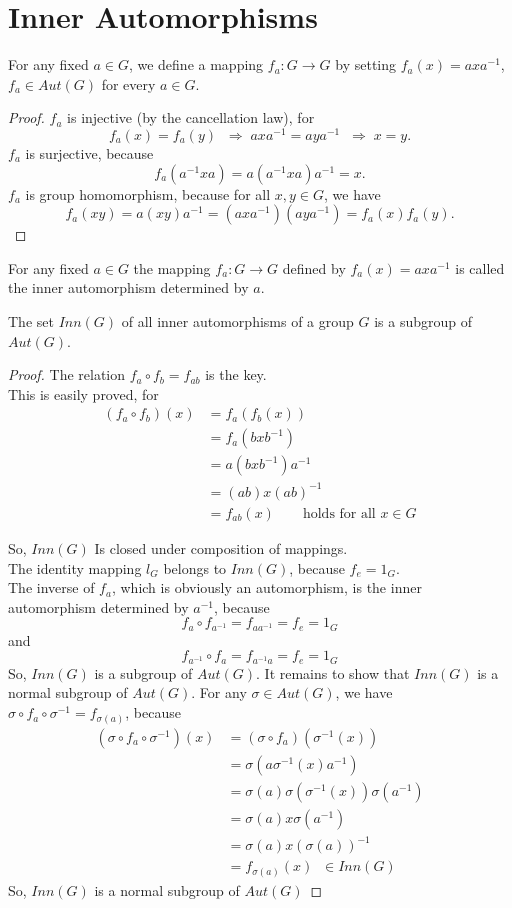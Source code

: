 \documentclass[../main-sheet.tex]{subfiles}
\begin{document}
\section{Inner Automorphisms}
For any fixed \(a\in G\), we define a mapping \(f_a:G\to G\) by setting \(f_a(x)=axa^{-1}\), \(f_a\in Aut(G)\) for every \(a\in G\).
\begin{proof}
    \(f_a\) is injective (by the cancellation law), for
    \[f_a(x)=f_a(y)\;\;\Rightarrow\; axa^{-1}=aya^{-1}\;\;\Rightarrow\;x=y.\]
    \(f_a\) is surjective, because
    \[f_a(a^{-1}xa)=a(a^{-1}xa)a^{-1}=x.\]
    \(f_a\) is group homomorphism, because for all \(x,y\in G\), we have
    \[f_a(xy)=a(xy)a^{-1}=(axa^{-1})(aya^{-1})=f_a(x)f_a(y).\]
\end{proof}
\begin{defn}
    For any fixed \(a\in G\) the mapping \(f_a:G\to G\) defined by \(f_a(x)=axa^{-1}\) is called the inner automorphism determined by \(a\).
\end{defn}
\begin{thm}
    The  set \(Inn(G)\) of all inner  automorphisms of a group \(G\)  is a
    subgroup of \(Aut(G)\).
\end{thm}
\begin{proof}
    The relation \(f_a \circ f_b = f_{ab}\) is the key.\\
    This is easily proved, for
    \begin{align*}
        (f_a\circ f_b)(x)&=f_a(f_b(x))\\
        &=f_a(bxb^{-1})\\
        &=a(bxb^{-1})a^{-1}\\
        &=(ab)x(ab)^{-1}\\
        &=f_{ab}(x)\qquad \text{holds for all } x\in G
    \end{align*}
    
    So, \(Inn(G)\) Is closed under composition of mappings.\\
    The identity mapping \(l_G\) belongs to \(Inn(G)\), because \(f_e = 1_G\).\\
The inverse of \(f_a\), which is obviously an automorphism, is the inner automorphism
determined by \(a^{-1}\), because
\[f_a \circ  f_{a^{-1}}= f_{aa^{-1}}=f_e=1_G\]
and 
\[f_{a^{-1}} \circ  f_{a}= f_{a^{-1}a}=f_e=1_G\]
So, \(Inn(G)\) is a subgroup of \(Aut(G)\).
It remains to show that \(Inn(G)\) is a normal subgroup of \(Aut(G)\).
For any \(\sigma \in Aut(G)\), we have \(\sigma \circ f_a \circ \sigma^{-1}  = f_{\sigma(a)}\), because
\begin{align*}
    (\sigma \circ f_a \circ \sigma^{-1})(x)&=(\sigma \circ f_a)(\sigma^{-1}(x))\\
    &=\sigma(a\sigma^{-1}(x)a^{-1})\\
    &=\sigma(a)\sigma(\sigma^{-1}(x))\sigma(a^{-1})\\
    &=\sigma(a)x\sigma(a^{-1})\\
    &=\sigma(a)x(\sigma(a))^{-1}\\
    &=f_{\sigma (a)}(x)\;\;\in Inn(G)
\end{align*}
So, \(Inn(G)\) is a normal subgroup of \(Aut(G)\)
\end{proof}
\end{document}
